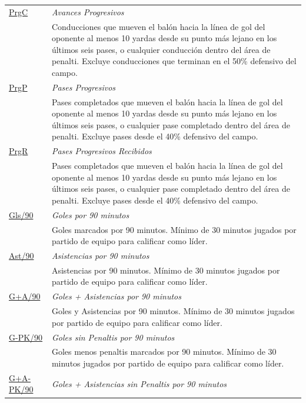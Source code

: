 \documentclass[a4paper,11pt]{article}
\theoremstyle{definition}
\begin{document}
\begin{longtable}{|l|p{12cm}|}
        \hline
        \hyperlink{tooltip:PrgC}{PrgC} & \textit{Avances Progresivos} \\
        & Conducciones que mueven el balón hacia la línea de gol del oponente al menos 10 yardas desde su punto más lejano en los últimos seis pases, o cualquier conducción dentro del área de penalti. Excluye conducciones que terminan en el 50\% defensivo del campo. \\
        \hline
        \hyperlink{tooltip:PrgP}{PrgP} & \textit{Pases Progresivos} \\
        & Pases completados que mueven el balón hacia la línea de gol del oponente al menos 10 yardas desde su punto más lejano en los últimos seis pases, o cualquier pase completado dentro del área de penalti. Excluye pases desde el 40\% defensivo del campo. \\
        \hline
        \hyperlink{tooltip:PrgR}{PrgR} & \textit{Pases Progresivos Recibidos} \\
        & Pases completados que mueven el balón hacia la línea de gol del oponente al menos 10 yardas desde su punto más lejano en los últimos seis pases, o cualquier pase completado dentro del área de penalti. Excluye pases desde el 40\% defensivo del campo. \\
        \hline
        \hyperlink{tooltip:Gls}{Gls/90} & \textit{Goles por 90 minutos} \\
        & Goles marcados por 90 minutos. Mínimo de 30 minutos jugados por partido de equipo para calificar como líder. \\
        \hline
        \hyperlink{tooltip:Ast}{Ast/90} & \textit{Asistencias por 90 minutos} \\
        & Asistencias por 90 minutos. Mínimo de 30 minutos jugados por partido de equipo para calificar como líder. \\
        \hline
        \hyperlink{tooltip:G+A}{G+A/90} & \textit{Goles + Asistencias por 90 minutos} \\
        & Goles y Asistencias por 90 minutos. Mínimo de 30 minutos jugados por partido de equipo para calificar como líder. \\
        \hline
        \hyperlink{tooltip:G-PK}{G-PK/90} & \textit{Goles sin Penaltis por 90 minutos} \\
        & Goles menos penaltis marcados por 90 minutos. Mínimo de 30 minutos jugados por partido de equipo para calificar como líder. \\
        \hline
        \hyperlink{tooltip:G+A-PK}{G+A-PK/90} & \textit{Goles + Asistencias sin Penaltis por 90 minutos} \\

\end{longtable}
\end{document}
